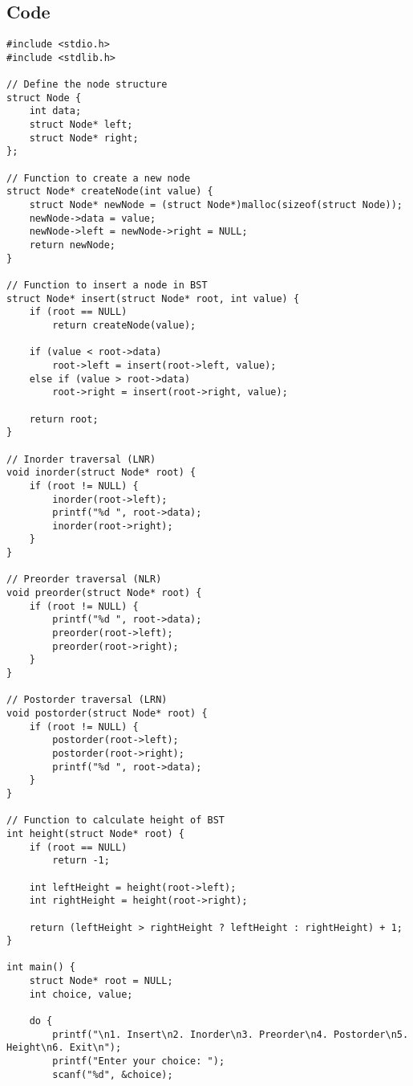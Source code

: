 \documentclass[12pt,a4paper]{article}
\begin{document}
\subsection*{Code}
\begin{lstlisting}
#include <stdio.h>
#include <stdlib.h>

// Define the node structure
struct Node {
    int data;
    struct Node* left;
    struct Node* right;
};

// Function to create a new node
struct Node* createNode(int value) {
    struct Node* newNode = (struct Node*)malloc(sizeof(struct Node));
    newNode->data = value;
    newNode->left = newNode->right = NULL;
    return newNode;
}

// Function to insert a node in BST
struct Node* insert(struct Node* root, int value) {
    if (root == NULL)
        return createNode(value);

    if (value < root->data)
        root->left = insert(root->left, value);
    else if (value > root->data)
        root->right = insert(root->right, value);

    return root;
}

// Inorder traversal (LNR)
void inorder(struct Node* root) {
    if (root != NULL) {
        inorder(root->left);
        printf("%d ", root->data);
        inorder(root->right);
    }
}

// Preorder traversal (NLR)
void preorder(struct Node* root) {
    if (root != NULL) {
        printf("%d ", root->data);
        preorder(root->left);
        preorder(root->right);
    }
}

// Postorder traversal (LRN)
void postorder(struct Node* root) {
    if (root != NULL) {
        postorder(root->left);
        postorder(root->right);
        printf("%d ", root->data);
    }
}

// Function to calculate height of BST
int height(struct Node* root) {
    if (root == NULL)
        return -1;

    int leftHeight = height(root->left);
    int rightHeight = height(root->right);

    return (leftHeight > rightHeight ? leftHeight : rightHeight) + 1;
}

int main() {
    struct Node* root = NULL;
    int choice, value;

    do {
        printf("\n1. Insert\n2. Inorder\n3. Preorder\n4. Postorder\n5. Height\n6. Exit\n");
        printf("Enter your choice: ");
        scanf("%d", &choice);


\end{lstlisting}
\end{document}
